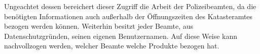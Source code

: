 Ungeachtet dessen bereichert dieser Zugriff die Arbeit der Polizeibeamten, da die benötigten Informationen auch außerhalb der Öffnungszeiten des Katasteramtes bezogen werden können.
Weiterhin besitzt jeder Beamte, aus Datenschutzgründen, seinen eigenen Benutzernamen.
Auf diese Weise kann nachvollzogen werden, welcher Beamte welche Produkte bezogen hat.

%



